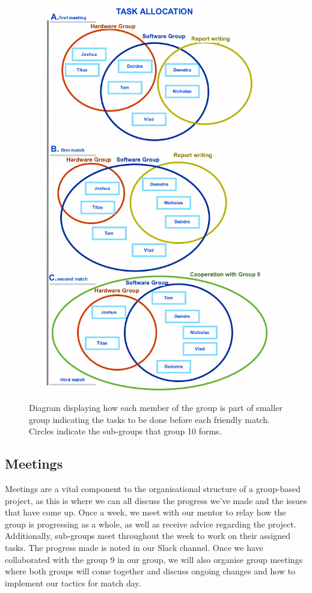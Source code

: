 \documentclass{article}
\begin{document}
\begin{figure}[H]
	\centering
	\begin{minipage}{1\textwidth}
		\centering
		\includegraphics[width=16cm, height=17cm]{task_allocation.png}\\
		\caption{Diagram displaying how each member of the group is part of smaller group indicating the tasks to be done before each friendly match. Circles indicate the sub-groups that group 10 forms.}
	\end{minipage}%
\end{figure}


\subsection{Meetings}
Meetings are a vital component to the organisational structure of a group-based project, as this is where we can all discuss the progress we've made and the issues that have come up. Once a week, we meet with our mentor to relay how the group is progressing as a whole, as well as receive advice regarding the project. Additionally, sub-groups meet throughout the week to work on their assigned tasks. The progress made is noted in our Slack channel. Once we have collaborated with the group 9 in our group, we will also organise group meetings where both groups will come together and discuss ongoing changes and how to implement our tactics for match day.
\end{document}
